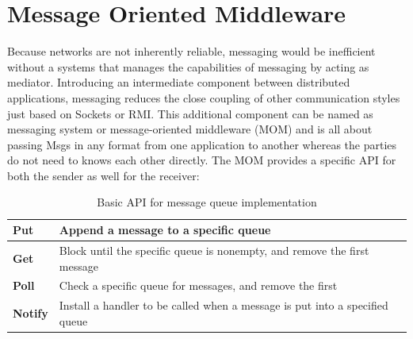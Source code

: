 
\newpage
\section{Message Oriented Middleware}
\label{intro-messaging-mom}
Because networks are not inherently reliable, messaging would be inefficient
without a systems that manages the capabilities of messaging by acting as
mediator. Introducing an intermediate component between distributed applications, messaging
reduces the close coupling of other communication styles just based on
\gls{Socket}s or RMI. This additional component can be named as messaging system
or message-oriented middleware (MOM) and is all about passing \gls{Msg}s in any
format from one application to another whereas the parties do not need to knows
each other directly. \cite{TAN06}
The MOM provides a specific API for both the sender as well for the receiver:
\begin{table}[H]
\centering
\begin{tabular}{|l|l|}
\hline
\textbf{Put}    & Append a message to a specific queue                                        \\ \hline
\textbf{Get}    & Block until the specific queue is nonempty, and remove the first message    \\ \hline
\textbf{Poll}   & Check a specific queue for messages, and remove the first                   \\ \hline
\textbf{Notify} & Install a handler to be called when a message is put into a specified queue \\ \hline
\end{tabular}
\caption{Basic API for message queue implementation \cite{TAN06}}
\end{table}

